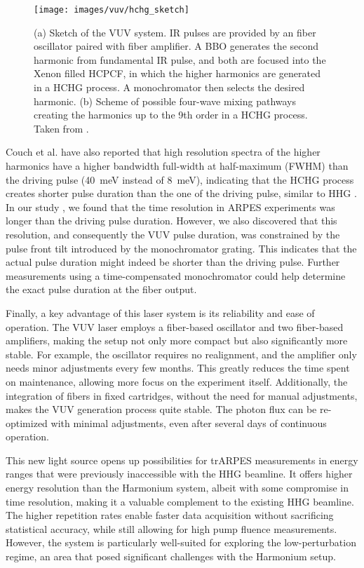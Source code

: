 \begin{figure}
	\centering
	\texttt{[image: images/vuv/hchg\_sketch]}
	\caption{(a) Sketch of the VUV system. IR pulses are provided by an  fiber oscillator paired with fiber amplifier. A BBO generates the second harmonic from fundamental IR pulse, and both are focused into the Xenon filled HCPCF, in which the higher harmonics are generated in a HCHG process. A monochromator then selects the desired harmonic. (b) Scheme of possible four-wave mixing pathways creating the harmonics up to the 9th order in a HCHG process. Taken from \cite{couch_ultrafast_2020}.}
	\label{fig:hchgsketch}
\end{figure}

Couch et al. \cite{couch_ultrafast_2020} have also reported that high resolution spectra of the higher harmonics have a higher bandwidth full-width at half-maximum (FWHM) than the driving pulse (\qty{40}{\milli\electronvolt} instead of \qty{8}{\milli\electronvolt}), indicating that the HCHG process creates shorter pulse duration than the one of the driving pulse, similar to HHG \cite{gagnon_soft_2007}.
In our study \cite{hellbruck_high-resolution_2024}, we found that the time resolution in ARPES experiments was longer than the driving pulse duration.
However, we also discovered that this resolution, and consequently the VUV pulse duration, was constrained by the pulse front tilt introduced by the monochromator grating.
This indicates that the actual pulse duration might indeed be shorter than the driving pulse.
Further measurements using a time-compensated monochromator could help determine the exact pulse duration at the fiber output.

Finally, a key advantage of this laser system is its reliability and ease of operation.
The VUV laser employs a fiber-based oscillator and two fiber-based amplifiers, making the setup not only more compact but also significantly more stable.
For example, the oscillator requires no realignment, and the amplifier only needs minor adjustments every few months.
This greatly reduces the time spent on maintenance, allowing more focus on the experiment itself.
Additionally, the integration of fibers in fixed cartridges, without the need for manual adjustments, makes the VUV generation process quite stable.
The photon flux can be re-optimized with minimal adjustments, even after several days of continuous operation.

This new light source opens up possibilities for trARPES measurements in energy ranges that were previously inaccessible with the HHG beamline.
It offers higher energy resolution than the Harmonium system, albeit with some compromise in time resolution, making it a valuable complement to the existing HHG beamline.
The higher repetition rates enable faster data acquisition without sacrificing statistical accuracy, while still allowing for high pump fluence measurements.
However, the system is particularly well-suited for exploring the low-perturbation regime, an area that posed significant challenges with the Harmonium setup.

